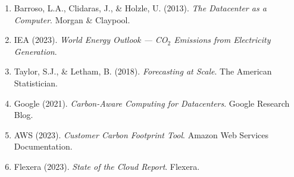\documentclass[12pt,a4paper]{report}
\begin{document}
\begin{enumerate}
    \item Barroso, L.A., Clidaras, J., \& Holzle, U. (2013). \textit{The Datacenter as a Computer}. Morgan \& Claypool.
    \item IEA (2023). \textit{World Energy Outlook --- CO$_2$ Emissions from Electricity Generation}.
    \item Taylor, S.J., \& Letham, B. (2018). \textit{Forecasting at Scale}. The American Statistician.
    \item Google (2021). \textit{Carbon-Aware Computing for Datacenters}. Google Research Blog.
    \item AWS (2023). \textit{Customer Carbon Footprint Tool}. Amazon Web Services Documentation.
    \item Flexera (2023). \textit{State of the Cloud Report}. Flexera.
\end{enumerate}
\end{document}
